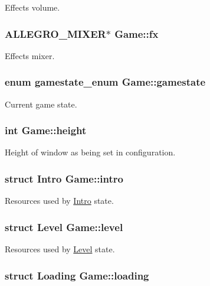 \-Effects volume. \hypertarget{structGame_adb4702bfcc1973de315ead6d683331b2}{
\subsubsection[{fx}]{\setlength{\rightskip}{0pt plus 5cm}\-A\-L\-L\-E\-G\-R\-O\-\_\-\-M\-I\-X\-E\-R$\ast$ {\bf \-Game\-::fx}}}\label{structGame_adb4702bfcc1973de315ead6d683331b2}
\-Effects mixer. \hypertarget{structGame_a5118a01ee6bb74fb41e8e8880a5b85a2}{
\subsubsection[{gamestate}]{\setlength{\rightskip}{0pt plus 5cm}enum {\bf gamestate\-\_\-enum} {\bf \-Game\-::gamestate}}}\label{structGame_a5118a01ee6bb74fb41e8e8880a5b85a2}
\-Current game state. \hypertarget{structGame_aa6d1743c45de5558a0ca99078df85250}{
\subsubsection[{height}]{\setlength{\rightskip}{0pt plus 5cm}int {\bf \-Game\-::height}}}\label{structGame_aa6d1743c45de5558a0ca99078df85250}
\-Height of window as being set in configuration. \hypertarget{structGame_afcc0b09f19df8162100973a002509000}{
\subsubsection[{intro}]{\setlength{\rightskip}{0pt plus 5cm}struct {\bf \-Intro} {\bf \-Game\-::intro}}}\label{structGame_afcc0b09f19df8162100973a002509000}
\-Resources used by \hyperlink{structIntro}{\-Intro} state. \hypertarget{structGame_aa258068886c6db9c88d73e07c7e114f2}{
\subsubsection[{level}]{\setlength{\rightskip}{0pt plus 5cm}struct {\bf \-Level} {\bf \-Game\-::level}}}\label{structGame_aa258068886c6db9c88d73e07c7e114f2}
\-Resources used by \hyperlink{structLevel}{\-Level} state. \hypertarget{structGame_a496f71737460d24add0f426f7fbc90b9}{
\subsubsection[{loading}]{\setlength{\rightskip}{0pt plus 5cm}struct {\bf \-Loading} {\bf \-Game\-::loading}}}\label{structGame_a496f71737460d24add0f426f7fbc90b9}

